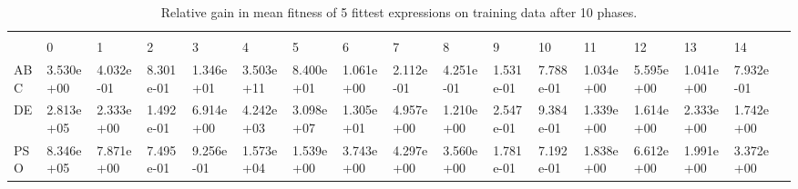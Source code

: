 \begin{landscape}
\begin{table}[]
\centering
\caption{Relative gain in mean fitness of 5 fittest expressions on training data after 10 phases.}
\label{table:10phasemeantrain}
\begin{adjustbox}{width=1.7\textwidth}
\begin{tabular}{lllllllllllllllll}
 &           &           &           &           &           &           &           &           &           &           &           &           &           &           &           &  \\
 & 0         & 1         & 2         & 3         & 4         & 5         & 6         & 7         & 8         & 9         & 10        & 11        & 12        & 13        & 14        &  \\
ABC                 & 3.530e+00 & 4.032e-01 & 8.301e-01 & 1.346e+01 & 3.503e+11 & 8.400e+01 & 1.061e+00 & 2.112e-01 & 4.251e-01 & 1.531e-01 & 7.788e-01 & 1.034e+00 & 5.595e+00 & 1.041e+00 & 7.932e-01 &  \\
DE                  & 2.813e+05 & 2.333e+00 & 1.492e-01 & 6.914e+00 & 4.242e+03 & 3.098e+07 & 1.305e+01 & 4.957e+00 & 1.210e+00 & 2.547e-01 & 9.384e-01 & 1.339e+00 & 1.614e+00 & 2.333e+00 & 1.742e+00 &  \\
PSO                 & 8.346e+05 & 7.871e+00 & 7.495e-01 & 9.256e-01 & 1.573e+04 & 1.539e+00 & 3.743e+00 & 4.297e+00 & 3.560e+00 & 1.781e-01 & 7.192e-01 & 1.838e+00 & 6.612e+00 & 1.991e+00 & 3.372e+00 &  \\
\end{tabular}
\end{adjustbox}
\end{table}



\end{landscape}
